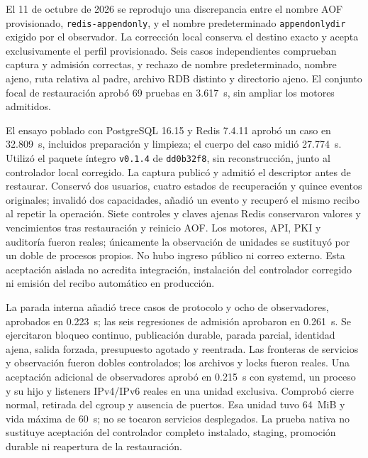 El 11 de octubre de 2026 se reprodujo una discrepancia entre el nombre AOF
provisionado, \texttt{redis-appendonly}, y el nombre predeterminado
\texttt{appendonlydir} exigido por el observador. La corrección local conserva
el destino exacto y acepta exclusivamente el perfil provisionado. Seis casos
independientes comprueban captura y admisión correctas, y rechazo de nombre
predeterminado, nombre ajeno, ruta relativa al padre, archivo RDB distinto y
directorio ajeno. El conjunto focal de restauración aprobó 69 pruebas en
3.617~s, sin ampliar los motores admitidos.

El ensayo poblado con PostgreSQL 16.15 y Redis 7.4.11 aprobó un caso en
32.809~s, incluidos preparación y limpieza; el cuerpo del caso midió
27.774~s. Utilizó el paquete íntegro \texttt{v0.1.4} de \texttt{dd0b32f8}, sin
reconstrucción, junto al controlador local corregido. La captura publicó y
admitió el descriptor antes de restaurar. Conservó dos usuarios, cuatro estados
de recuperación y quince eventos originales; invalidó dos capacidades, añadió
un evento y recuperó el mismo recibo al repetir la operación. Siete controles
y claves ajenas Redis conservaron valores y vencimientos tras restauración y
reinicio AOF. Los motores, API, PKI y auditoría fueron reales; únicamente la
observación de unidades se sustituyó por un doble de procesos propios. No hubo
ingreso público ni correo externo. Esta aceptación aislada no acredita
integración, instalación del controlador corregido ni emisión del recibo
automático en producción.

La parada interna añadió trece casos de protocolo y ocho de observadores,
aprobados en 0.223~s; las seis regresiones de admisión aprobaron en 0.261~s.
Se ejercitaron bloqueo continuo, publicación durable, parada parcial, identidad
ajena, salida forzada, presupuesto agotado y reentrada. Las fronteras de
servicios y observación fueron dobles controlados; los archivos y locks fueron
reales. Una aceptación adicional de observadores aprobó en 0.215~s con systemd,
un proceso y su hijo y listeners IPv4/IPv6 reales en una unidad exclusiva.
Comprobó cierre normal, retirada del cgroup y ausencia de puertos. Esa unidad
tuvo 64~MiB y vida máxima de 60~s; no se tocaron servicios desplegados.
La prueba nativa no sustituye aceptación del controlador completo instalado,
staging, promoción durable ni reapertura de la restauración.

